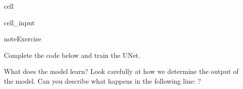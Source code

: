 \documentclass[letterpaper,10pt,english]{jupyterBook}
\begin{document}
\begin{sphinxuseclass}{cell}\begin{sphinxVerbatimInput}

\begin{sphinxuseclass}{cell_input}
\begin{sphinxVerbatim}[commandchars=\\\{\}]
   
    
\end{sphinxVerbatim}

\end{sphinxuseclass}\end{sphinxVerbatimInput}

\end{sphinxuseclass}
\begin{sphinxadmonition}{note}{Exercise}

\sphinxAtStartPar
Complete the code below and train the U\sphinxhyphen{}Net.

\sphinxAtStartPar
What does the model learn? Look carefully at how we determine the output of the model. Can you describe what happens in the following line: ?
\end{sphinxadmonition}
\end{document}
